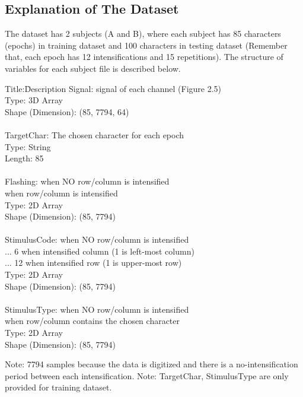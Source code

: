 \subsection{Explanation of The Dataset}
The dataset has 2 subjects (A and B), where each subject has 85 characters (epochs) in training dataset and 100 characters in testing dataset (Remember that, each epoch has 12 intensifications and 15 repetitions). The structure of variables for each subject file is described below.\newline
\begin{tabbing}
Title:\quad \quad \quad \quad \quad \=Description\kill
Signal:         \>signal of each channel (Figure 2.5)\\
                \>Type: 3D Array\\
                \>Shape (Dimension): (85, 7794, 64)\\
\newline\\
TargetChar:     \>The chosen character for each epoch\\
                \>Type: String\\
                \>Length: 85\\
\newline\\
Flashing:	    	when NO row/column is intensified\\
                	when row/column is intensified\\
                \>Type: 2D Array\\
                \>Shape (Dimension): (85, 7794)\\
\newline\\
StimulusCode:		when NO row/column is intensified\\
                 ... 6	when intensified column (1 is left-most column)\\
                 ... 12	when intensified row (1 is upper-most row)\\
                \>Type: 2D Array\\
                \>Shape (Dimension): (85, 7794)\\
\newline\\
StimulusType:		when NO row/column is intensified\\
		        	when row/column contains the chosen character\\
                \>Type: 2D Array\\
                \>Shape (Dimension): (85, 7794)\\
\end{tabbing}
Note: 7794 samples because the data is digitized and there is a no-intensification period between each intensification.
Note: TargetChar, StimulusType are only provided for training dataset.

